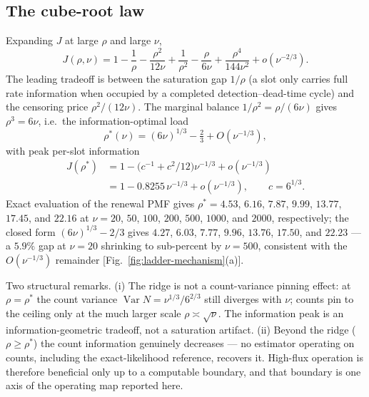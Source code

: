 \documentclass[10pt,twocolumn]{article}
\begin{document}
\subsection{The cube-root law}
Expanding $J$ at large $\rho$ and large $\nu$,
\begin{equation}
  J(\rho,\nu) = 1 - \frac{1}{\rho} - \frac{\rho^{2}}{12\nu}
  + \frac{1}{\rho^{2}} - \frac{\rho}{6\nu} + \frac{\rho^{4}}{144\nu^{2}}
  + o(\nu^{-2/3}).
  \label{eq:Jexpansion}
\end{equation}
The leading tradeoff is between the saturation gap $1/\rho$ (a slot only
carries full rate information when occupied by a completed
detection--dead-time cycle) and the censoring price $\rho^{2}/(12\nu)$. The
marginal balance $1/\rho^{2} = \rho/(6\nu)$ gives $\rho^{3} = 6\nu$, i.e.\
the information-optimal load
\begin{equation}
  \rho^{*}(\nu) = (6\nu)^{1/3} - \tfrac{2}{3} + O(\nu^{-1/3}),
  \label{eq:cuberoot}
\end{equation}
with peak per-slot information
\begin{equation}
  \begin{aligned}
  J(\rho^{*})
    &=1-\bigl(c^{-1}+c^{2}/12\bigr)\nu^{-1/3}+o(\nu^{-1/3})\\
    &=1-0.8255\,\nu^{-1/3}+o(\nu^{-1/3}),
    \qquad c=6^{1/3}.
  \end{aligned}
  \label{eq:peakJ}
\end{equation}
Exact evaluation of the renewal PMF gives $\rho^{*} = 4.53$, $6.16$, $7.87$,
$9.99$, $13.77$, $17.45$, and $22.16$ at $\nu = 20$, $50$, $100$, $200$,
$500$, $1000$, and $2000$, respectively; the closed form
$(6\nu)^{1/3} - 2/3$ gives $4.27$, $6.03$, $7.77$, $9.96$, $13.76$, $17.50$,
and $22.23$ — a $5.9\%$ gap at $\nu = 20$ shrinking to sub-percent by
$\nu = 500$, consistent with the $O(\nu^{-1/3})$ remainder
[Fig.~\ref{fig:ladder-mechanism}(a)].

Two structural remarks. (i) The ridge is not a count-variance pinning
effect: at $\rho = \rho^{*}$ the count variance
$\operatorname{Var} N = \nu^{1/3}/6^{2/3}$ still diverges with $\nu$; counts
pin to the ceiling only at the much larger scale $\rho \asymp \sqrt{\nu}$.
The information peak is an information-geometric tradeoff, not a saturation
artifact. (ii) Beyond the ridge ($\rho \ge \rho^{*}$) the count information
genuinely decreases — no estimator operating on counts, including the
exact-likelihood reference, recovers it. High-flux operation is therefore
beneficial only up to a computable boundary, and that boundary is one axis
of the operating map reported here.
\end{document}
